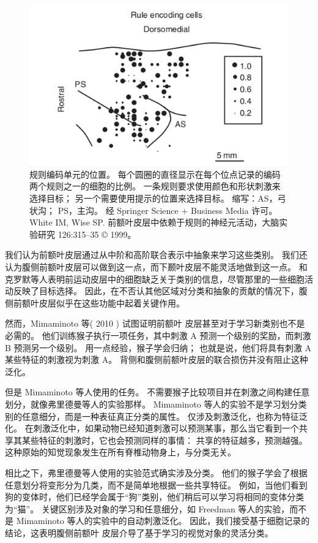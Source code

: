 \begin{figure}
	\centering
	\includegraphics[width=0.6\linewidth]{image_pfc/Fig_7_8}
	\caption{规则编码单元的位置。 
		每个圆圈的直径显示在每个位点记录的编码两个规则之一的细胞的比例。 
		一条规则要求使用颜色和形状刺激来选择目标； 另一个需要使用提示的位置来选择目标。 
		缩写：AS，弓状沟； PS，主沟。 
		经 Springer Science + Business Media 许可。 
		White IM, Wise SP.
		前额叶皮层中依赖于规则的神经元活动，大脑实验研究 126:315–35 © 1999。\label{fig:7_8}}
\end{figure}
\par


我们认为前额叶皮层通过从中阶和高阶联合表示中抽象来学习这些类别。 
我们还认为腹侧前额叶皮层可以做到这一点，而下颞叶皮层不能灵活地做到这一点。 
和克罗默等人\cite{cromer2011comparison}表明前运动皮层中的细胞缺乏关于类别的信息，尽管那里的一些细胞活动反映了目标选择。 
因此，在不否认其他区域对分类和抽象的贡献的情况下，腹侧前额叶皮层似乎在这些功能中起着关键作用。
\par


然而，Mimaminoto 等( 2010 ) 试图证明前额叶 皮层甚至对于学习新类别也不是必需的。 
他们训练猴子执行一项任务，其中刺激 A 预测一个级别的奖励，而刺激 B 预测另一个级别。 
用一点经验，猴子学会归纳； 也就是说，他们将具有刺激 A 某些特征的刺激视为刺激 A。
背侧和腹侧前额叶皮层的联合损伤并没有阻止这种泛化。
\par


但是 Mimaminoto 等人使用的任务。 
不需要猴子比较项目并在刺激之间构建任意划分，就像弗里德曼等人的实验那样。
Mimaminoto 等人的实验不是学习划分类别的任意细分，而是一种表征真正分类的属性。 
仅涉及刺激泛化，也称为特征泛化\cite{buckley2010top}。 
在刺激泛化中，如果动物已经知道刺激可以预测某事，那么当它看到一个共享其某些特征的刺激时，它也会预测同样的事情：
共享的特征越多，预测越强。
这种原始的知觉现象发生在所有脊椎动物身上，与分类无关。
\par


相比之下，弗里德曼等人使用的实验范式\cite{freedman2002visual}确实涉及分类。 
他们的猴子学会了根据任意划分将变形分为几类，而不是简单地根据一些共享特征。
例如，当他们看到狗的变体时，他们已经学会属于“狗”类别，他们稍后可以学习将相同的变体分类为“猫”。
关键区别涉及对象的学习和任意细分，如 Freedman 等人的实验，而不是 Mimaminoto 等人的实验中的自动刺激泛化。
因此，我们接受基于细胞记录的结论，这表明腹侧前额叶 皮层介导了基于学习的视觉对象的灵活分类。
\par


